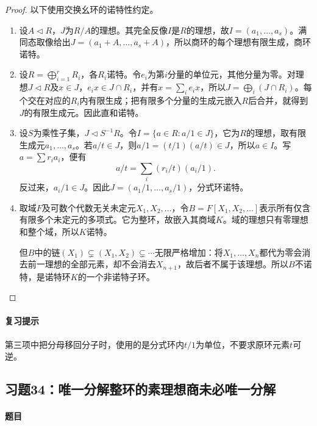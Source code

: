 \begin{proof}

以下使用交换幺环的诺特性约定。
\begin{enumerate}[label=(\roman*)]
\item 设$A\lhd R$，$J$为$R/A$的理想。其完全反像$I$是$R$的理想，故$I=(a_1,\ldots,a_s)$。满同态取像给出$J=(a_1+A,\ldots,a_s+A)$，所以商环的每个理想有限生成，商环诺特。
\item 设$R=\bigoplus\limits_{i=1}^rR_i$，各$R_i$诺特。令$e_i$为第$i$分量的单位元，其他分量为零。对理想$J\lhd R$及$x\in J$，$e_ix\in J\cap R_i$，并有$x=\sum_i e_ix$，所以$J=\bigoplus_i(J\cap R_i)$。每个交在对应的$R_i$内有限生成；把有限多个分量的生成元嵌入$R$后合并，就得到$J$的有限生成元。因此直和诺特。
\item 设$S$为乘性子集，$J\lhd S^{-1}R$。令$I=\{a\in R:a/1\in J\}$，它为$R$的理想，取有限生成元$a_1,\ldots,a_s$。若$a/t\in J$，则$a/1=(t/1)(a/t)\in J$，所以$a\in I$。写$a=\sum r_ia_i$，便有
\[
a/t=\sum_i(r_i/t)(a_i/1).
\]
反过来，$a_i/1\in J$。因此$J=(a_1/1,\ldots,a_s/1)$，分式环诺特。
\item 取域$F$及可数个代数无关未定元$X_1,X_2,\ldots$，令$B=F[X_1,X_2,\ldots]$表示所有仅含有限多个未定元的多项式。它为整环，故嵌入其商域$K$。域的理想只有零理想和整个域，所以$K$诺特。

但$B$中的链$(X_1)\subsetneq(X_1,X_2)\subsetneq\cdots$无限严格增加：将$X_1,\ldots,X_n$都代为零会消去前一理想的全部元素，却不会消去$X_{n+1}$，故后者不属于该理想。所以$B$不诺特，是诺特环$K$的一个非诺特子环。
\end{enumerate}

\end{proof}

\paragraph{复习提示}

第三项中把分母移回分子时，使用的是分式环内$t/1$为单位，不要求原环元素$t$可逆。

\subsection{习题34：唯一分解整环的素理想商未必唯一分解}

\label{ex:4:34}

\paragraph{题目}


